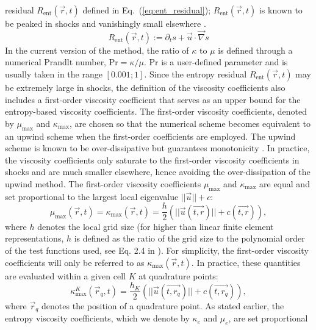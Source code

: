 \documentclass[review,10pt]{elsarticle}
\newcommand{\grad}{\vec{\nabla}}
\renewcommand{\Pr}{\textrm{Pr}}
\newcommand{\resi}{R_\text{ent}}
\newcommand{\eqt}[1]{Eq.~(\ref{#1})}                     %
\begin{document}
residual $\resi(\vec{r},t)$ defined in \eqt{eq:ent_residual}; $\resi(\vec{r},t)$ is known to be 
peaked in shocks and vanishingly small elsewhere \cite{Toro}. 
%
\begin{equation}
\label{eq:ent_residual}
\resi(\vec{r}, t) := \partial_t s + \vec{u} \cdot \grad s
\end{equation}
%
In the current version of the method, the ratio of $\kappa$ to $\mu$ is defined through a numerical 
Prandlt number, $\Pr = \kappa / \mu$.  $\Pr$ is a user-defined parameter and is usually taken in the 
range $[ 0.001; 1 ]$. Since the entropy residual $\resi(\vec{r},t)$ may be extremely large in shocks, 
the definition of the viscosity coefficients also includes a first-order viscosity coefficient that 
serves as an upper bound for the entropy-based viscosity coefficients. The first-order viscosity 
coefficients, denoted by $\mu_{\max}$ and $\kappa_{\max}$, are chosen so that the numerical scheme 
becomes equivalent to an upwind scheme when the first-order coefficients are employed. The upwind 
scheme is known to be over-dissipative but guarantees monotonicity \cite{Toro}. In practice, the 
viscosity coefficients only saturate to the first-order viscosity coefficients in shocks and are 
much smaller elsewhere, hence avoiding the over-dissipation of the upwind method.  The first-order 
viscosity coefficients $\mu_{\max}$ and $\kappa_{\max}$ are equal and set proportional to the 
largest local eigenvalue $|| \vec{u} || + c $:
%
\begin{equation}
\label{eq:fo}
\mu_{\max}(\vec{r}, t) = \kappa_{\max}(\vec{r}, t) = \frac{h}{2} \left( || \vec{u}(\vec{t,r}) || + c(\vec{t,r}) \right),
\end{equation}
%
where $h$ denotes the local grid size (for higher than linear finite element representations, $h$ is defined 
as the ratio of the grid size to the polynomial order of the test functions used, see Eq. 2.4 in \cite{valentin}). 
For simplicity, the first-order viscosity coefficients will only be referred to as $\kappa_{\max}(\vec{r}, t)$. 
In practice, these quantities are evaluated within a given cell $K$ at quadrature points:
%
\begin{equation}
\label{eq:fo_quad}
\kappa^K_{\max}(\vec{r}_q, t) = \frac{h_K}{2} \left( || \vec{u}(\vec{t,r_q}) || + c(\vec{t,r_q}) \right),
\end{equation}
%
where $\vec{r}_q$ denotes the position of a quadrature point.
As stated earlier, the entropy viscosity coefficients, which we denote by $\kappa_e$ and $\mu_e$, are set proportional 
\end{document}
